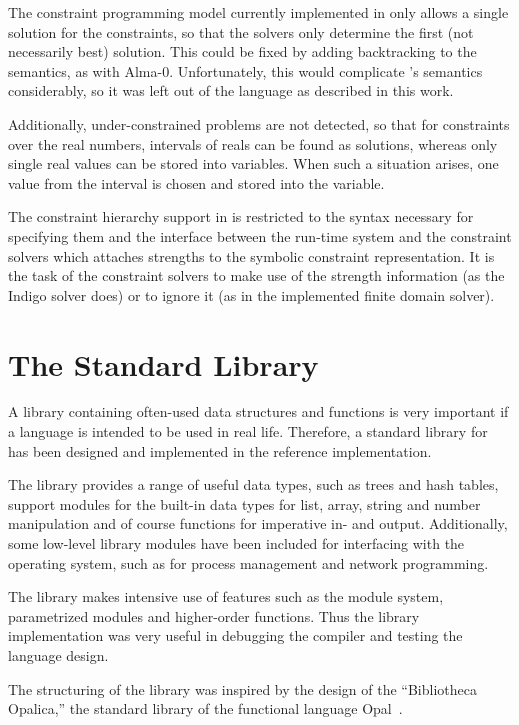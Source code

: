 The constraint programming model currently implemented in \turtle{}
only allows a single solution for the constraints, so that the solvers
only determine the first (not necessarily best) solution.  This could
be fixed by adding backtracking to the \turtle{} semantics, as with
Alma-0.  Unfortunately, this would complicate \turtle{}'s semantics
considerably, so it was left out of the language as described in this
work.

Additionally, under-constrained problems are not detected, so that for
constraints over the real numbers, intervals of reals can be found as
solutions, whereas only single real values can be stored into
\turtle{} variables.  When such a situation arises, one value from the
interval is chosen and stored into the variable.

The constraint hierarchy support in \turtle{} is restricted to the
syntax necessary for specifying them and the interface between the
run-time system and the constraint solvers which attaches strengths to
the symbolic constraint representation.  It is the task of the
constraint solvers to make use of the strength information (as the
Indigo solver does) or to ignore it (as in the implemented finite
domain solver).

\section{The Standard Library}

A library containing often-used data structures and functions is very
important if a language is intended to be used in real life.
Therefore, a standard library for \turtle{} has been designed and
implemented in the reference implementation.

The library provides a range of useful data types, such as trees and
hash tables, support modules for the built-in data types for list,
array, string and number manipulation and of course functions for
imperative in- and output.  Additionally, some low-level library
modules have been included for interfacing with the operating system,
such as for process management and network programming.

The library makes intensive use of \turtle{} features such as the
module system, pa\-ra\-me\-trized modules and higher-order functions.
Thus the library implementation was very useful in debugging the
compiler and testing the language design.

The structuring of the library was inspired by the design of the
``Bibliotheca Opalica,'' the standard library of the functional
language Opal~\cite{Pepper.Opal}.

